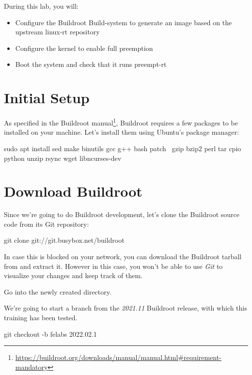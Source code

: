 
During this lab, you will:
\begin{itemize}
	\item Configure the Buildroot Build-system to generate an image based on the upstream linux-rt repository
	\item Configure the kernel to enable full preemption
	\item Boot the system and check that it runs preempt-rt
\end{itemize}

\section{Initial Setup}
As specified in the Buildroot
manual\footnote{\url{https://buildroot.org/downloads/manual/manual.html\#requirement-mandatory}},
Buildroot requires a few packages to be installed on your
machine. Let's install them using Ubuntu's package manager:

\begin{bashinput}
sudo apt install sed make binutils gcc g++ bash patch \
  gzip bzip2 perl tar cpio python unzip rsync wget libncurses-dev
\end{bashinput}

\section{Download Buildroot}

Since we're going to do Buildroot development, let's clone the
Buildroot source code from its Git repository:

\begin{bashinput}
git clone git://git.busybox.net/buildroot
\end{bashinput}

In case this is blocked on your network, you can download the Buildroot
tarball \code{buildroot-2021.11.tar.bz2} from
 and extract it. However in this
case, you won't be able to use {\em Git} to visualize your changes and
keep track of them.

Go into the newly created  directory.

We're going to start a branch from the {\em 2021.11} Buildroot
release, with which this training has been tested.

\begin{bashinput}
git checkout -b felabs 2022.02.1
\end{bashinput}


